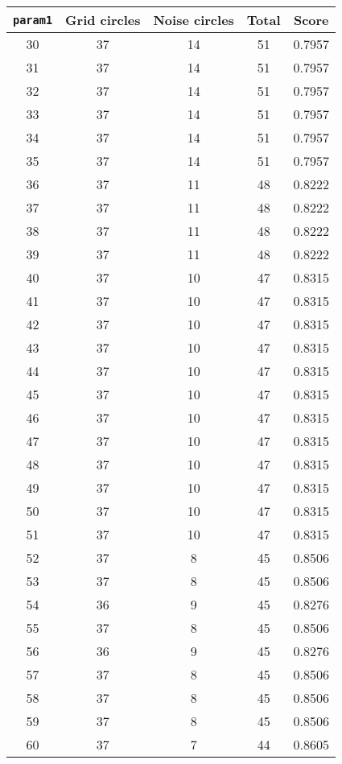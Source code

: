 \documentclass[letterpaper, 12pt]{article}
\begin{document}
\begin{longtable}{|c|c|c|c|c|}
\hline
\textbf{\texttt{param1}} & \textbf{Grid circles} & \textbf{Noise circles} & \textbf{Total} & \textbf{Score} \\
\hline
30 & 37 & 14 & 51 & 0.7957 \\
\hline
31 & 37 & 14 & 51 & 0.7957 \\
\hline
32 & 37 & 14 & 51 & 0.7957 \\
\hline
33 & 37 & 14 & 51 & 0.7957 \\
\hline
34 & 37 & 14 & 51 & 0.7957 \\
\hline
35 & 37 & 14 & 51 & 0.7957 \\
\hline
36 & 37 & 11 & 48 & 0.8222 \\
\hline
37 & 37 & 11 & 48 & 0.8222 \\
\hline
38 & 37 & 11 & 48 & 0.8222 \\
\hline
39 & 37 & 11 & 48 & 0.8222 \\
\hline
40 & 37 & 10 & 47 & 0.8315 \\
\hline
41 & 37 & 10 & 47 & 0.8315 \\
\hline
42 & 37 & 10 & 47 & 0.8315 \\
\hline
43 & 37 & 10 & 47 & 0.8315 \\
\hline
44 & 37 & 10 & 47 & 0.8315 \\
\hline
45 & 37 & 10 & 47 & 0.8315 \\
\hline
46 & 37 & 10 & 47 & 0.8315 \\
\hline
47 & 37 & 10 & 47 & 0.8315 \\
\hline
48 & 37 & 10 & 47 & 0.8315 \\
\hline
49 & 37 & 10 & 47 & 0.8315 \\
\hline
50 & 37 & 10 & 47 & 0.8315 \\
\hline
51 & 37 & 10 & 47 & 0.8315 \\
\hline
52 & 37 & 8 & 45 & 0.8506 \\
\hline
53 & 37 & 8 & 45 & 0.8506 \\
\hline
54 & 36 & 9 & 45 & 0.8276 \\
\hline
55 & 37 & 8 & 45 & 0.8506 \\
\hline
56 & 36 & 9 & 45 & 0.8276 \\
\hline
57 & 37 & 8 & 45 & 0.8506 \\
\hline
58 & 37 & 8 & 45 & 0.8506 \\
\hline
59 & 37 & 8 & 45 & 0.8506 \\
\hline
60 & 37 & 7 & 44 & 0.8605 \\

\end{longtable}
\end{document}
